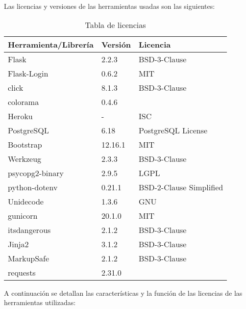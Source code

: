 Las licencias y versiones de las herramientas usadas son las siguientes:
\begin{table}[ht!]
    \centering
    \resizebox{13cm}{!} {
    \begin{tabular}{|l|l|l|}
    \hline
         \textbf{Herramienta/Librería}     &  \textbf{Versión}   &\textbf{Licencia} \\ \hline
         {Flask}       & {2.2.3 }  &{BSD-3-Clause} \\ \hline
         {Flask-Login}       & {0.6.2}  &{MIT} \\ \hline
         {click}       & {8.1.3}  &{BSD-3-Clause} \\ \hline
         {colorama}       & {0.4.6}    &{ } \\ \hline 
         {Heroku}       & {-}    &{ISC} \\ \hline 
         {PostgreSQL}       & {6.18 }    &{PostgreSQL License} \\ \hline 
         {Bootstrap}       & {12.16.1}    &{MIT} \\ \hline 
         {Werkzeug}       & {2.3.3}    &{BSD-3-Clause} \\ \hline 
         {psycopg2-binary}       & {2.9.5}    &{LGPL} \\ \hline 
         {python-dotenv}       & {0.21.1}    &{BSD-2-Clause Simplified} \\ \hline 
         {Unidecode}       & {1.3.6}    &{GNU} \\ \hline 
         {gunicorn}       & {20.1.0}    &{MIT} \\ \hline 
         {itsdangerous}       & {2.1.2}    &{BSD-3-Clause} \\ \hline 
         {Jinja2}       & {3.1.2}    &{BSD-3-Clause} \\ \hline 
         {MarkupSafe}       & {2.1.2}    &{BSD-3-Clause} \\ \hline 
         {requests}       & {2.31.0}    &{ } \\ \hline 
    \end{tabular}}
    \caption{Tabla de licencias}
    \label{tab:licencias}
\end{table}

A continuación se detallan las características y la función de las licencias de las herramientas utilizadas:

